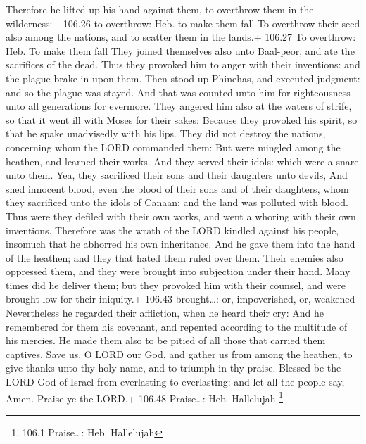 Therefore he lifted up his hand against them, to overthrow them in the
wilderness:+ 106.26 to overthrow: Heb. to make them fall 
To overthrow their seed also among the nations, and to scatter them in
the lands.+ 106.27 To overthrow: Heb. To make them fall 
They joined themselves also unto Baal-peor, and ate the sacrifices of
the dead.  Thus they provoked him to anger with their
inventions: and the plague brake in upon them.  Then stood
up Phinehas, and executed judgment: and so the plague was stayed.
 And that was counted unto him for righteousness unto all
generations for evermore.  They angered him also at the
waters of strife, so that it went ill with Moses for their sakes:
 Because they provoked his spirit, so that he spake
unadvisedly with his lips.  They did not destroy the
nations, concerning whom the LORD commanded them:  But were
mingled among the heathen, and learned their works.  And
they served their idols: which were a snare unto them. 
Yea, they sacrificed their sons and their daughters unto devils,
 And shed innocent blood, even the blood of their sons and
of their daughters, whom they sacrificed unto the idols of Canaan: and
the land was polluted with blood.  Thus were they defiled
with their own works, and went a whoring with their own inventions.
 Therefore was the wrath of the LORD kindled against his
people, insomuch that he abhorred his own inheritance.  And
he gave them into the hand of the heathen; and they that hated them
ruled over them.  Their enemies also oppressed them, and
they were brought into subjection under their hand.  Many
times did he deliver them; but they provoked him with their counsel, and
were brought low for their iniquity.+ 106.43 brought\ldots: or,
impoverished, or, weakened  Nevertheless he regarded their
affliction, when he heard their cry:  And he remembered for
them his covenant, and repented according to the multitude of his
mercies.  He made them also to be pitied of all those that
carried them captives.  Save us, O LORD our God, and gather
us from among the heathen, to give thanks unto thy holy name, and to
triumph in thy praise.  Blessed be the LORD God of Israel
from everlasting to everlasting: and let all the people say, Amen.
Praise ye the LORD.+ 106.48 Praise\ldots: Heb. Hallelujah \footnote{106.1
  Praise\ldots: Heb. Hallelujah}

